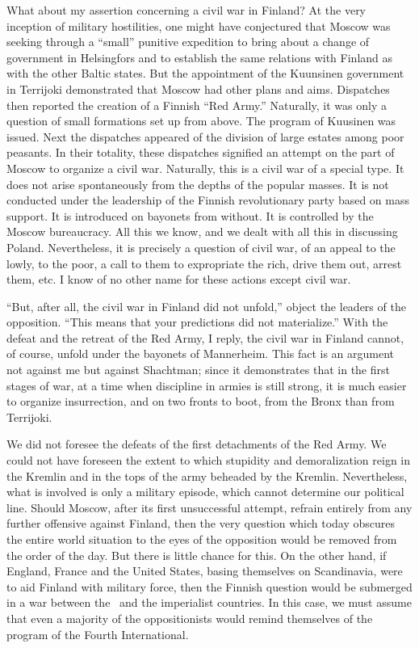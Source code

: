 What about my assertion concerning a civil war in Finland? At the very inception of military hostilities, one might have conjectured that Moscow was seeking through a “small” punitive expedition to bring about a change of government in Helsingfors and to establish the same relations with Finland as with the other Baltic states. But the appointment of the Kuunsinen government in Terrijoki demonstrated that Moscow had other plans and aims. Dispatches then reported the creation of a Finnish “Red Army.” Naturally, it was only a question of small formations set up from above. The program of Kuusinen was issued. Next the dispatches appeared of the division of large estates among poor peasants. In their totality, these dispatches signified an attempt on the part of Moscow to organize a civil war. Naturally, this is a civil war of a special type. It does not arise spontaneously from the depths of the popular masses. It is not conducted under the leadership of the Finnish revolutionary party based on mass support. It is introduced on bayonets from without. It is controlled by the Moscow bureaucracy. All this we know, and we dealt with all this in discussing Poland. Nevertheless, it is precisely a question of civil war, of an appeal to the lowly, to the poor, a call to them to expropriate the rich, drive them out, arrest them, etc. I know of no other name for these actions except civil war.

“But, after all, the civil war in Finland did not unfold,” object the leaders of the opposition. “This means that your predictions did not materialize.” With the defeat and the retreat of the Red Army, I reply, the civil war in Finland cannot, of course, unfold under the bayonets of Mannerheim. This fact is an argument not against me but against Shachtman; since it demonstrates that in the first stages of war, at a time when discipline in armies is still strong, it is much easier to organize insurrection, and on two fronts to boot, from the Bronx than from Terrijoki.

We did not foresee the defeats of the first detachments of the Red Army. We could not have foreseen the extent to which stupidity and demoralization reign in the Kremlin and in the tops of the army beheaded by the Kremlin. Nevertheless, what is involved is only a military episode, which cannot determine our political line. Should Moscow, after its first unsuccessful attempt, refrain entirely from any further offensive against Finland, then the very question which today obscures the entire world situation to the eyes of the opposition would be removed from the order of the day. But there is little chance for this. On the other hand, if England, France and the United States, basing themselves on Scandinavia, were to aid Finland with military force, then the Finnish question would be submerged in a war between the \USSR\ and the imperialist countries. In this case, we must assume that even a majority of the oppositionists would remind themselves of the program of the Fourth International.

